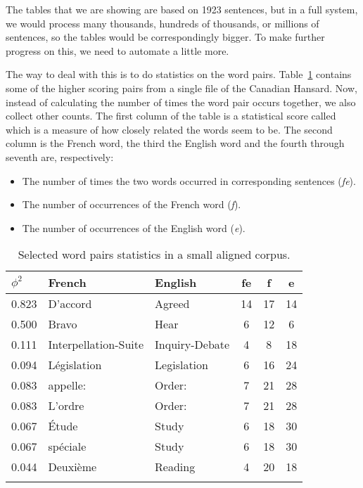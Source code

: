 The tables that we are showing are based on 1923 sentences, but in a full system, we would
process many thousands, hundreds of thousands, or millions of
sentences, so the tables would be correspondingly bigger. To make
further progress on this, we need to automate a little more.

The way to deal with this is to do statistics on the word
pairs. Table~\ref{pair:stats} contains some of the higher scoring
pairs from a single file of the Canadian Hansard. Now, instead of
calculating the number of times the word pair occurs together, we also
collect other counts. 
The first column of the table is a statistical
score called  which is a measure of how closely related the
words seem to be. The second column is the French word, the third the
English word and the fourth through seventh are, respectively:

\begin{itemize}
\item The number of times the two words occurred in corresponding
  sentences (\emph{fe}).
\item The number of occurrences of the French word (\emph{f}).
\item The number of occurrences of the English word (\emph{e}).
\end{itemize}

\begin{table}
\begin{tabular}{lllccc}
\lsptoprule
$ \phi^2 $ & French &  English & fe & f & e \\\midrule
0.823 & D'accord & Agreed & 14 & 17  & 14 \\
0.500 &  Bravo & Hear & 6 & 12 & 6  \\
0.111 & Interpellation-Suite & Inquiry-Debate & 4 & 8 & 18  \\
0.094 & Législation & Legislation & 6 & 16 & 24  \\
0.083 & appelle: & Order: & 7 & 21 & 28  \\
0.083& L'ordre & Order: &  7 & 21 & 28  \\
0.067 & Étude & Study &  6 & 18 & 30  \\
0.067 &  spéciale & Study&  6 & 18 & 30 \\
0.044 & Deuxième &  Reading & 4 &  20 & 18\\
\lspbottomrule
\end{tabular}
\caption{Selected word pairs statistics in a small aligned corpus.}
\label{pair:stats}
\end{table}


